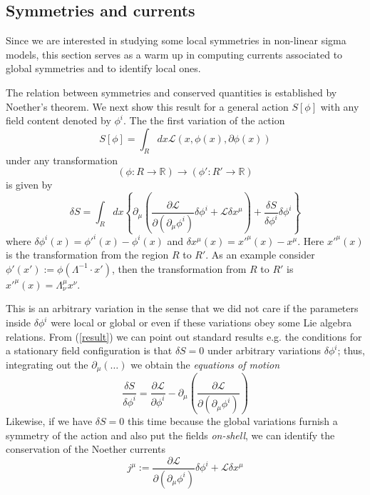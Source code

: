 \documentclass[a4paper,12pt]{article}
\numberwithin{equation}{section}
\numberwithin{thm}{section}
\numberwithin{exm}{section}
\newcommand{\p}{\partial}
\newcommand{\lag}{\mathcal L}
\newcommand{\<}{{\langle}}
\renewcommand{\>}{{\rangle}}
\renewcommand{\d}{{\delta}}
\newcommand{\m}{{\mu}}
\begin{document}
\subsection{Symmetries and currents}
Since we are interested in studying some local symmetries in non-linear sigma models, this section serves as a warm up in computing currents associated to global symmetries and to identify local ones.

The relation between symmetries and conserved quantities is established by Noether's theorem. We next show this result for a general action $S[\phi]$ with any field content denoted by $\phi^i$. The the first variation of the action
	\begin{equation}
	S[\phi]=\int_R dx \lag(x,\phi(x),\p\phi(x))
	\end{equation}
under any transformation
	\begin{equation}
	(\phi:R\rightarrow\mathbb R)\longrightarrow(\phi':R'\rightarrow\mathbb R)
	\end{equation}
is given by
	\begin{equation}\label{result}
	\delta S=\int_R dx \left\{\p_\mu \left(\frac{\p\lag}{\p(\p_\mu\phi^i)}\delta\phi^i+\lag\delta x^\mu\right)+\frac{\delta S}{\delta \phi^i}\delta\phi^i\right\}
	\end{equation}
where $\delta\phi^i(x)=\phi'^i(x)-\phi^i(x)$ and $\delta x^\mu(x)=x'^\mu(x)-x^\mu$. Here $x'^\mu(x)$ is the transformation from the region $R$ to $R'$. As an example consider $\phi'(x'):=\phi(\Lambda^{-1}\cdot x')$, then the transformation from $R$ to $R'$ is $x'^\mu(x)=\Lambda^\mu_\nu x^\nu$.

This is an arbitrary variation in the sense that we did not care if the parameters inside $\d \phi^i$ were local or global or even if these variations obey some Lie algebra relations. From (\ref{result}) we can point out standard results e.g. the conditions for a stationary field configuration is that $\d S = 0$ under arbitrary variations $\d \phi^i$; thus, integrating out the $\p_\m(\ldots)$ we obtain the {\it equations of motion}
	\begin{equation}
	\frac{\d S}{\d \phi^i} = \frac{\p \lag}{\p \phi^i} - \p_\m \left( \frac{\p \lag}{\p(\p_\m \phi^i)} \right)
	\end{equation}
Likewise, if we have $\d S = 0$ this time because the global variations furnish a symmetry of the action and also put the fields {\it on-shell}, we can identify the conservation of the Noether currents
	\begin{equation}
	j^\m := \frac{\p\lag}{\p(\p_\mu\phi^i)}\delta\phi^i+\lag\delta x^\mu
	\end{equation}
\end{document}
